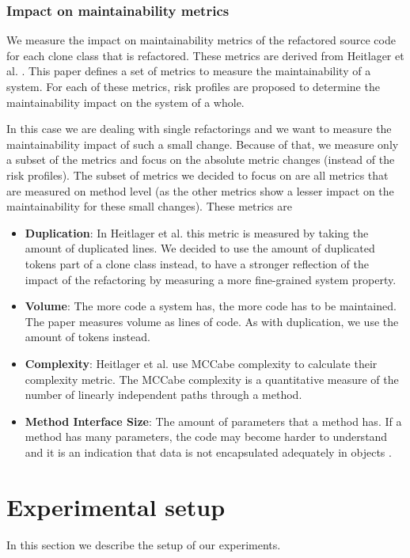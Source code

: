 \documentclass[sigconf,review]{acmart}
\begin{document}
\subsubsection{Impact on maintainability metrics} \label{sec:metrics}
We measure the impact on maintainability metrics of the refactored source code for each clone class that is refactored. These metrics are derived from Heitlager et al. \cite{heitlager2007practical}. This paper defines a set of metrics to measure the maintainability of a system. For each of these metrics, risk profiles are proposed to determine the maintainability impact on the system of a whole.

In this case we are dealing with single refactorings and we want to measure the maintainability impact of such a small change. Because of that, we measure only a subset of the metrics \cite{heitlager2007practical} and focus on the absolute metric changes (instead of the risk profiles). The subset of metrics we decided to focus on are all metrics that are measured on method level (as the other metrics show a lesser impact on the maintainability for these small changes). These metrics are
\begin{itemize}
\item \textbf{Duplication}: In Heitlager et al. \cite{heitlager2007practical} this metric is measured by taking the amount of duplicated lines. We decided to use the amount of duplicated tokens part of a clone class instead, to have a stronger reflection of the impact of the refactoring by measuring a more fine-grained system property.
\item \textbf{Volume}: The more code a system has, the more code has to be maintained. The paper \cite{heitlager2007practical} measures volume as lines of code. As with duplication, we use the amount of tokens instead.
\item \textbf{Complexity}: Heitlager et al. use MCCabe complexity \cite{mccabe1976complexity} to calculate their complexity metric. The MCCabe complexity is a quantitative measure of the number of linearly independent paths through a method.
\item \textbf{Method Interface Size}: The amount of parameters that a method has. If a method has many parameters, the code may become harder to understand and it is an indication that data is not encapsulated adequately in objects \cite{fowler2018refactoring}.
\end{itemize}

\section{Experimental setup}
In this section we describe the setup of our experiments.
\end{document}
